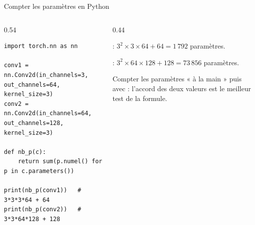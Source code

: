 \begin{frame}[fragile]{Compter les paramètres en Python}
\begin{columns}[t]
\begin{column}{0.54\textwidth}
\begin{codebox}
\begin{lstlisting}
import torch.nn as nn

conv1 = nn.Conv2d(in_channels=3, out_channels=64, kernel_size=3)
conv2 = nn.Conv2d(in_channels=64, out_channels=128, kernel_size=3)

def nb_p(c):
    return sum(p.numel() for p in c.parameters())

print(nb_p(conv1))   # 3*3*3*64 + 64
print(nb_p(conv2))   # 3*3*64*128 + 128
\end{lstlisting}
\end{codebox}
\end{column}
\begin{column}{0.44\textwidth}
\begin{ebox}
 : $3^2 \times 3 \times 64 + 64 = 1\,792$ paramètres.

\medskip
{} : $3^2 \times 64 \times 128 + 128 = 73\,856$ paramètres.
\end{ebox}
\begin{kbox}
Compter les paramètres « à la main » puis avec  : l'accord des
deux valeurs est le meilleur test de la formule.
\end{kbox}
\end{column}
\end{columns}
\end{frame}

